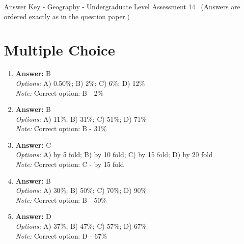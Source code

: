 \documentclass[12pt]{article}
\begin{document}
\begin{center}
Answer Key - Geography - Undergraduate Level Assessment 14 \
\small (Answers are ordered exactly as in the question paper.)
\end{center}

\section*{Multiple Choice}
\begin{enumerate}[label=\arabic*.]
\item \textbf{Answer:} B
\\ \textit{Options:} A) 0.50\%; B) 2\%; C) 6\%; D) 12\%
\\ \textit{Note:} Correct option: B - 2\%
\item \textbf{Answer:} B
\\ \textit{Options:} A) 11\%; B) 31\%; C) 51\%; D) 71\%
\\ \textit{Note:} Correct option: B - 31\%
\item \textbf{Answer:} C
\\ \textit{Options:} A) by 5 fold; B) by 10 fold; C) by 15 fold; D) by 20 fold
\\ \textit{Note:} Correct option: C - by 15 fold
\item \textbf{Answer:} B
\\ \textit{Options:} A) 30\%; B) 50\%; C) 70\%; D) 90\%
\\ \textit{Note:} Correct option: B - 50\%
\item \textbf{Answer:} D
\\ \textit{Options:} A) 37\%; B) 47\%; C) 57\%; D) 67\%
\\ \textit{Note:} Correct option: D - 67\%
\end{enumerate}
\end{document}
